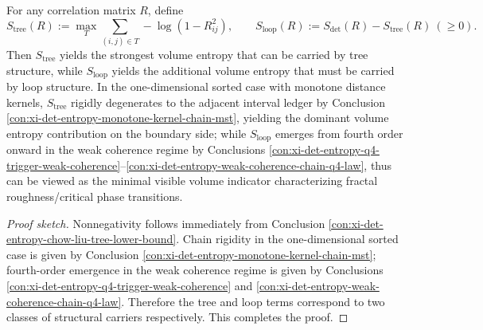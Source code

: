 \begin{conclusion}\label{con:xi-det-entropy-tree-loop-stratification}
For any correlation matrix \(R\), define
\[
S_{\mathrm{tree}}(R):=\max_{T}\sum_{(i,j)\in T}-\log(1-R_{ij}^2),
\qquad
S_{\mathrm{loop}}(R):=S_{\det}(R)-S_{\mathrm{tree}}(R)\ (\ge0).
\]
Then \(S_{\mathrm{tree}}\) yields the strongest volume entropy that can be carried by tree structure, while \(S_{\mathrm{loop}}\) yields the additional volume entropy that must be carried by loop structure.
In the one-dimensional sorted case with monotone distance kernels, \(S_{\mathrm{tree}}\) rigidly degenerates to the adjacent interval ledger by Conclusion \ref{con:xi-det-entropy-monotone-kernel-chain-mst}, yielding the dominant volume entropy contribution on the boundary side;
while \(S_{\mathrm{loop}}\) emerges from fourth order onward in the weak coherence regime by Conclusions \ref{con:xi-det-entropy-q4-trigger-weak-coherence}--\ref{con:xi-det-entropy-weak-coherence-chain-q4-law}, thus can be viewed as the minimal visible volume indicator characterizing fractal roughness/critical phase transitions.
\end{conclusion}
\begin{proof}[Proof sketch]
Nonnegativity follows immediately from Conclusion \ref{con:xi-det-entropy-chow-liu-tree-lower-bound}.
Chain rigidity in the one-dimensional sorted case is given by Conclusion \ref{con:xi-det-entropy-monotone-kernel-chain-mst};
fourth-order emergence in the weak coherence regime is given by Conclusions \ref{con:xi-det-entropy-q4-trigger-weak-coherence} and \ref{con:xi-det-entropy-weak-coherence-chain-q4-law}.
Therefore the tree and loop terms correspond to two classes of structural carriers respectively. This completes the proof.
\end{proof}
